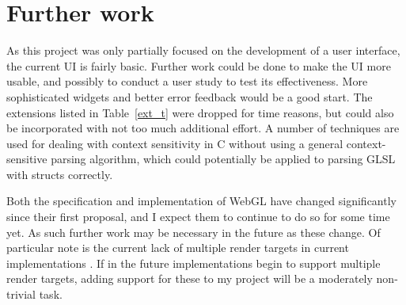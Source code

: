 \documentclass[12pt,twoside,notitlepage]{report}
\begin{document}
\section{Further work}
As this project was only partially focused on the development of a user interface, the current UI is fairly basic. Further work could be done to make the UI more usable, and possibly to conduct a user study to test its effectiveness. More sophisticated widgets and better error feedback would be a good start. The extensions listed in Table~\ref{ext_t} were dropped for time reasons, but could also be incorporated with not too much additional effort. A number of techniques are used for dealing with context sensitivity in C without using a general context-sensitive parsing algorithm, which could potentially be applied to parsing GLSL with structs correctly.

Both the specification and implementation of WebGL have changed significantly since their first proposal, and I expect them to continue to do so for some time yet. As such further work may be necessary in the future as these change. Of particular note is the current lack of multiple render targets in current implementations \citet{webgl-future}. If in the future implementations begin to support multiple render targets, adding support for these to my project will be a moderately non-trivial task.

\cleardoublepage



\cleardoublepage

\appendix



\end{document}
